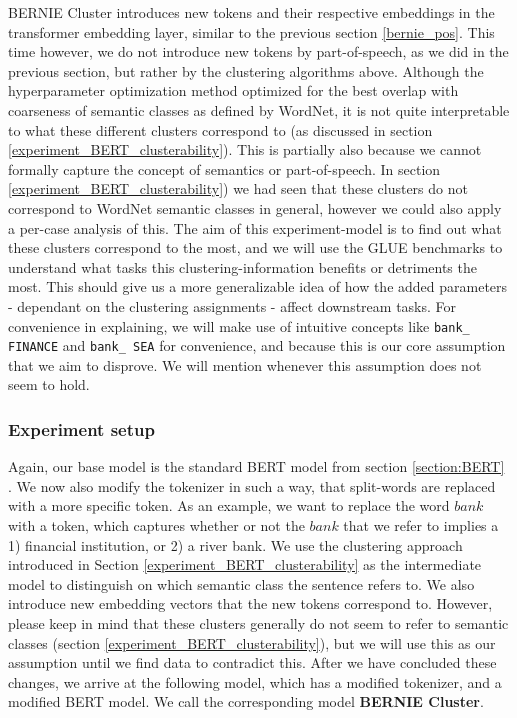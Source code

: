 \documentclass[a4paper,12pt,oneside,openright]{report}
\begin{document}
BERNIE Cluster introduces new tokens and their respective embeddings in the transformer embedding layer, similar to the previous section \ref{bernie_pos}.
This time however, we do not introduce new tokens by part-of-speech, as we did in the previous section, but rather by the clustering algorithms above.
Although the hyperparameter optimization method optimized for the best overlap with coarseness of semantic classes as defined by WordNet, it is not quite interpretable to what these different clusters correspond to (as discussed in section  \ref{experiment_BERT_clusterability}).
This is partially also because we cannot formally capture the concept of semantics or part-of-speech.
In section \ref{experiment_BERT_clusterability}) we had seen that these clusters do not correspond to WordNet semantic classes in general, however we could also apply a per-case analysis of this.
The aim of this experiment-model is to find out what these clusters correspond to the most, and we will use the GLUE benchmarks to understand what tasks this clustering-information benefits or detriments the most.
This should give us a more generalizable idea of how the added parameters - dependant on the clustering assignments - affect downstream tasks.
For convenience in explaining, we will make use of intuitive concepts like \texttt{bank\_ FINANCE} and \texttt{bank\_ SEA} for convenience, and because this is our core assumption that we aim to disprove.
We will mention whenever this assumption does not seem to hold.

\subsubsection{Experiment setup}

Again, our base model is the standard BERT model from section \ref{section:BERT} .
We now also modify the tokenizer in such a way, that split-words are replaced with a more specific token.
As an example, we want to replace the word $bank$ with a token, which captures whether or not the $bank$ that we refer to implies a 1) financial institution, or 2) a river bank.
We use the clustering approach introduced in Section \ref{experiment_BERT_clusterability} as the intermediate model to distinguish on which semantic class the sentence refers to.
We also introduce new embedding vectors that the new tokens correspond to.
However, please keep in mind that these clusters generally do not seem to refer to semantic classes (section \ref{experiment_BERT_clusterability}), but we will use this as our assumption until we find data to contradict this.
After we have concluded these changes, we arrive at the following model, which has a modified tokenizer, and a modified BERT model.
We call the corresponding model \textbf{BERNIE Cluster}.
\end{document}
